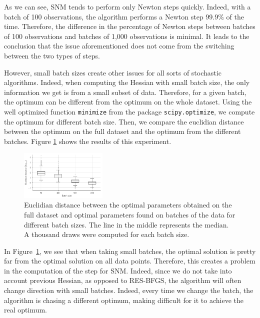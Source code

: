\documentclass[conference]{IEEEtran}
\begin{document}
As we can see, SNM tends to perform only Newton steps quickly. Indeed, with a batch of 100 observations, the algorithm performs a Newton step 99.9\% of the time. Therefore, the difference in the percentage of Newton steps between batches of 100 observations and batches of 1,000 observations is minimal. It leads to the conclusion that the issue aforementioned does not come from the switching between the two types of steps.

However, small batch sizes create other issues for all sorts of stochastic algorithms. Indeed, when computing the Hessian with small batch size, the only information we get is from a small subset of data. Therefore, for a given batch, the optimum can be different from the optimum on the whole dataset. Using the well optimized function \texttt{minimize} from the package \texttt{scipy.optimize}, we compute the optimum for different batch size. Then, we compare the euclidian distance between the optimum on the full dataset and the optimum from the different batches. Figure \ref{fig:batch_dist} shows the results of this experiment.

\begin{figure}[t]
\centering
\includegraphics[width=0.37\textwidth]{../figures/dist.pdf}
\vspace{-0.3cm}
\caption{Euclidian distance between the optimal parameters obtained on the full dataset and optimal parameters found on batches of the data for different batch sizes. The line in the middle represents the median. A thousand draws were computed for each batch size.}
\label{fig:batch_dist}
\vspace{-0.5cm}
\end{figure}

In Figure~\ref{fig:batch_dist}, we see that when taking small batches, the optimal solution is pretty far from the optimal solution on all data points. Therefore, this creates a problem in the computation of the step for SNM. Indeed, since we do not take into account previous Hessian, as opposed to RES-BFGS, the algorithm will often change direction with small batches. Indeed, every time we change the batch, the algorithm is chasing a different optimum, making difficult for it to achieve the real optimum. 
\end{document}
